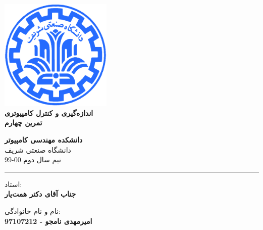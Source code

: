 \documentclass[12pt]{article}
\begin{document}
\begin{titlepage}
\begin{center}
        
\vspace*{0.7cm}

\includegraphics[width=0.4\textwidth]{sharif1.png}\\
\vspace{0.5cm}
\textbf{ \Huge{\emph ‌اندازه‌گیری و کنترل کامپیوتری} }\\
\vspace{0.5cm}
\textbf{ \Large{ تمرین چهارم} }
\vspace{0.2cm}
       
 
      \large \textbf{دانشکده مهندسی کامپیوتر}\\\vspace{0.2cm}
    \large   دانشگاه صنعتی شریف\\\vspace{0.2cm}
       \large   ﻧﯿﻢ سال دوم 00-99 \\\vspace{0.2cm}
      \noindent\rule[1ex]{\linewidth}{1pt}
استاد:\\
    \textbf{{جناب آقای دکتر همت‌یار}}


    \vspace{0.15cm}
نام و نام خانوادگی:\\

       
    \textbf{{امیرمهدی نامجو - 97107212}}
\end{center}
\end{titlepage}


\newpage
\pagestyle{fancy}
\fancyhf{}
\fancyfoot{}
\cfoot{\thepage}
\end{document}
